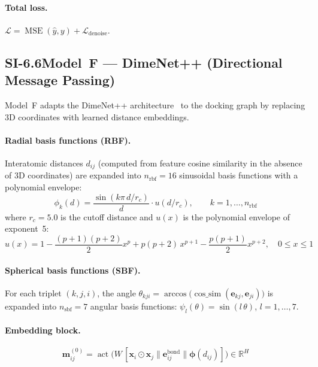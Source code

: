 \documentclass[11pt]{article}
\begin{document}
\paragraph{Total loss.}
$\mathcal{L} = \operatorname{MSE}(\hat{y}, y) + \mathcal{L}_{\mathrm{denoise}}$.

\subsection*{SI-6.6\quad Model~F --- DimeNet++ (Directional Message Passing)}
\label{si:model_f}

Model~F adapts the DimeNet++ architecture~\cite{gasteiger2020fast} to the
docking graph by replacing 3D coordinates with learned distance embeddings.

\paragraph{Radial basis functions (RBF).}
Interatomic distances $d_{ij}$ (computed from feature cosine similarity in
the absence of 3D coordinates) are expanded into $n_{\mathrm{rbf}} = 16$
sinusoidal basis functions with a polynomial envelope:
\begin{equation}
  \phi_k(d) = \frac{\sin(k \pi\, d / r_c)}{d}
  \cdot u(d / r_c), \qquad k = 1, \ldots, n_{\mathrm{rbf}}
\end{equation}
where $r_c = 5.0$ is the cutoff distance and $u(x)$ is the polynomial
envelope of exponent~5:
\begin{equation}
  u(x) = 1 - \frac{(p+1)(p+2)}{2} x^p
  + p(p+2)\, x^{p+1}
  - \frac{p(p+1)}{2} x^{p+2}, \quad 0 \leq x \leq 1
\end{equation}

\paragraph{Spherical basis functions (SBF).}
For each triplet $(k, j, i)$, the angle
$\theta_{kji} = \arccos\!\bigl(
\operatorname{cos\_sim}(\mathbf{e}_{kj}, \mathbf{e}_{ji})\bigr)$
is expanded into $n_{\mathrm{sbf}} = 7$ angular basis functions:
$\psi_l(\theta) = \sin(l\, \theta)$, $l = 1, \ldots, 7$.

\paragraph{Embedding block.}
\begin{equation}
  \mathbf{m}_{ij}^{(0)} = \operatorname{act}\!\bigl(
    W\, [\mathbf{x}_i \odot \mathbf{x}_j \|
    \mathbf{e}_{ij}^{\mathrm{bond}} \|
    \boldsymbol{\phi}(d_{ij})]
  \bigr) \in \mathbb{R}^{H}
\end{equation}
\end{document}

